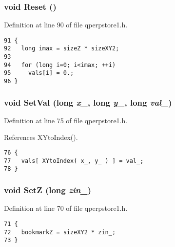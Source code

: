 \subsubsection{\setlength{\rightskip}{0pt plus 5cm}void Reset ()}\label{qperpstore1_8h_372de693ad40b3f42839c8ec6ac845f4}




Definition at line 90 of file qperpstore1.h.

\begin{Code}\begin{verbatim}91 {
92   long imax = sizeZ * sizeXY2;
93   
94   for (long i=0; i<imax; ++i)
95     vals[i] = 0.;
96 }
\end{verbatim}
\end{Code}


\subsubsection{\setlength{\rightskip}{0pt plus 5cm}void SetVal (long {\em x\_\-}, long {\em y\_\-}, long {\em val\_\-})}\label{qperpstore1_8h_b553105dc5e4c85d03275fed3d74b8d5}




Definition at line 75 of file qperpstore1.h.

References XYtoIndex().

\begin{Code}\begin{verbatim}76 {
77   vals[ XYtoIndex( x_, y_ ) ] = val_;
78 }
\end{verbatim}
\end{Code}


\subsubsection{\setlength{\rightskip}{0pt plus 5cm}void SetZ (long {\em zin\_\-})}\label{qperpstore1_8h_369d36f2cf516db573e5620b3cbe3a3c}




Definition at line 70 of file qperpstore1.h.

\begin{Code}\begin{verbatim}71 {
72   bookmarkZ = sizeXY2 * zin_;
73 }
\end{verbatim}
\end{Code}


